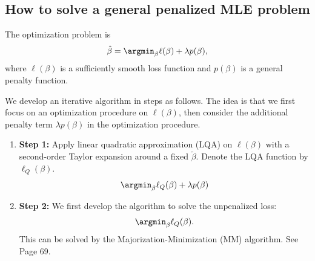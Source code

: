 \subsection{How to solve a general penalized MLE problem}


The optimization problem is
\[
\hat\beta = \argmin_\beta \ell(\beta) + \lambda p(\beta),
\]
where $\ell(\beta)$ is a sufficiently smooth loss function and $p(\beta)$ is a general penalty function.

We develop an iterative algorithm in steps as follows. The idea is that we first focus on an optimization procedure on $\ell(\beta)$, then consider the additional penalty term $\lambda p(\beta)$ in the optimization procedure.
\begin{enumerate}
    \item \textbf{Step 1:} Apply linear quadratic approximation (LQA) on $\ell(\beta)$ with a second-order Taylor expansion around a fixed $\tilde{\beta}$. Denote the LQA function by $\ell_Q(\beta)$. 
    \[
    \argmin_\beta \ell_Q(\beta) + \lambda p(\beta)
    \]
    \item \textbf{Step 2:} We first develop the algorithm to solve the unpenalized loss:
    \[
    \argmin_\beta \ell_Q(\beta).
    \]
    This can be solved by the Majorization-Minimization (MM) algorithm. See Page 69.
\end{enumerate}


